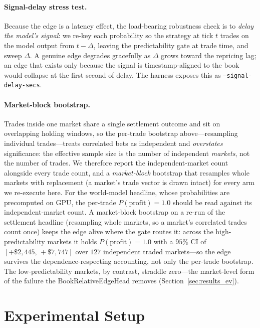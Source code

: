 \documentclass{article}
\begin{document}
\paragraph{Signal-delay stress test.}
Because the edge is a latency effect, the load-bearing robustness check is to
\emph{delay the model's signal}: we re-key each probability so the strategy at
tick $t$ trades on the model output from $t-\Delta$, leaving the predictability
gate at trade time, and sweep $\Delta$.  A genuine edge degrades gracefully as
$\Delta$ grows toward the repricing lag; an edge that exists only because the
signal is timestamp-aligned to the book would collapse at the first second of
delay.  The harness exposes this as \texttt{--signal-delay-secs}.

\paragraph{Market-block bootstrap.}
Trades inside one market share a single settlement outcome and sit on
overlapping holding windows, so the per-trade bootstrap above---resampling
individual trades---treats correlated bets as independent and
\emph{overstates} significance: the effective sample size is the number of
independent \emph{markets}, not the number of trades.  We therefore report the
independent-market count alongside every trade count, and a \emph{market-block}
bootstrap that resamples whole markets with replacement (a market's trade
vector is drawn intact) for every arm we re-execute here.  For the world-model
headline, whose probabilities are precomputed on GPU, the per-trade
$P(\text{profit})=1.0$ should be read against its independent-market count.  A
market-block bootstrap on a re-run of the settlement headline (resampling whole
markets, so a market's correlated trades count once) keeps the edge alive where
the gate routes it: across the high-predictability markets it holds
$P(\text{profit})=1.0$ with a $95\%$ CI of $[+\$2{,}445,\,+\$7{,}747]$ over $127$
independent traded markets---so the edge survives the dependence-respecting
accounting, not only the per-trade bootstrap.  The low-predictability markets, by
contrast, straddle zero---the market-level form of the failure the
BookRelativeEdgeHead removes (Section~\ref{sec:results_ev}).

\section{Experimental Setup}\label{sec:experiments}
\end{document}

